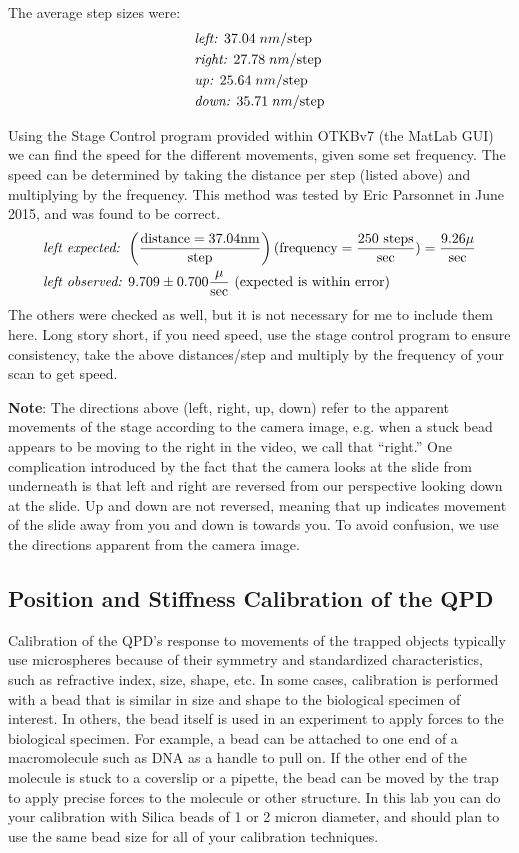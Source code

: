 \documentclass{../lab}
\begin{document}
The average step sizes were:
\begin{align*}
    &\emph{left: } 37.04 \;nm/ \text{step} \\
    &\emph{right: } 27.78 \;nm/\text{step} \\
    &\emph{up: } 25.64 \;nm/\text{step} \\
    &\emph{down: } 35.71 \;nm/\text{step}
\end{align*}

\newpage

Using the Stage Control program provided within OTKBv7 (the MatLab GUI) we can find the speed for the different movements, given some set frequency. The speed can be determined by taking the distance per step (listed above) and multiplying by the frequency. This method was tested by Eric Parsonnet in June 2015, and was found to be correct.
\begin{align*}
    &\emph{left expected: } \left(\frac{\text{distance} = 37.04 \text{nm}}{\text{step}}\right)(\text{frequency} = \frac{250\text{ steps}}{\text{sec}})=\frac{9.26 \mu}{\text{sec}} \\
    &\emph{left observed: } 9.709 \pm 0.700 \frac{\mu}{\text{sec}} \text{ (expected is within error)}
\end{align*}
The others were checked as well, but it is not necessary for me to include them here. Long story short, if you need speed, use the stage control program to ensure consistency, take the above distances/step and multiply by the frequency of your scan to get speed.

\textbf{Note}: The directions above (left, right, up, down) refer to the apparent movements of the stage according to the camera image, e.g. when a stuck bead appears to be moving to the right in the video, we call that ``right.'' One complication introduced by the fact that the camera looks at the slide from underneath is that left and right are reversed from our perspective looking down at the slide. Up and down are not reversed, meaning that up indicates movement of the slide away from you and down is towards you. To avoid confusion, we use the directions apparent from the camera image.

\subsection{Position and Stiffness Calibration of the QPD}

Calibration of the QPD's response to movements of the trapped objects typically use microspheres because of their symmetry and standardized characteristics, such as refractive index, size, shape, etc. In some cases, calibration is performed with a bead that is similar in size and shape to the biological specimen of interest. In others, the bead itself is used in an experiment to apply forces to the biological specimen. For example, a bead can be attached to one end of a macromolecule such as DNA as a handle to pull on. If the other end of the molecule is stuck to a coverslip or a pipette, the bead can be moved by the trap to apply precise forces to the molecule or other structure. In this lab you can do your calibration with Silica beads of 1 or 2 micron diameter, and should plan to use the same bead size for all of your calibration techniques.
\end{document}
